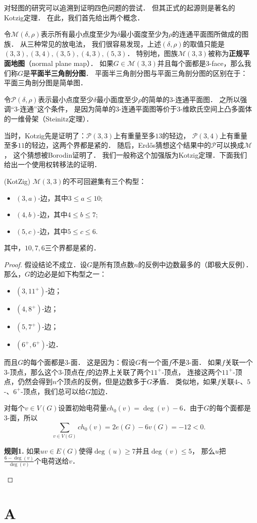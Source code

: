 \documentclass[cn,fancy,blue,11pt]{elegantbook}
\begin{document}
对轻图的研究可以追溯到证明四色问题的尝试．
但其正式的起源则是著名的Kotzig定理．
在此，我们首先给出两个概念．

令$\mathcal{M}(\delta,\rho)$表示所有最小点度至少为$\delta$最小面度至少为$\rho$的连通平面图所做成的图族．
从三种常见的放电法，
我们很容易发现，上述$(\delta,\rho)$的取值只能是$(3,3),(3,4),(3,5),(4,3),(5,3)$．
特别地，图族$\mathcal{M}(3,3)$被称为\textbf{正规平面地图}（normal plane map）．
如果$G\in \mathcal{M}(3,3)$并且每个面都是$3$-face，那么我们称$G$是\textbf{平面半三角剖分图}．
平面半三角剖分图与平面三角剖分图的区别在于：平面三角剖分图是简单图．

令$\mathcal{P}(\delta,\rho)$表示最小点度至少$\delta$最小面度至少$\rho$的简单的$3$-连通平面图．
之所以强调``3-连通''这个条件，
是因为简单的3-连通平面图等价于3-维欧氏空间上凸多面体的一维骨架（Steinitz定理）．

当时，Kotzig先是证明了：$\mathcal{P}(3,3)$上有重量至多$13$的轻边，
$\mathcal{P}(3,4)$上有重量至多$11$的轻边，这两个界都是紧的．
随后，Erd\H{o}s猜想这个结果中的$\mathcal{P}$可以换成$\mathcal{M}$，
这个猜想被Borodin证明了．
我们一般称这个加强版为Kotzig定理．下面我们给出一个使用权转移法的证明．

\begin{theorem}{(KotZig)}{}
	$\mathcal{M}(3,3)$的不可回避集有三个构型：
	\begin{itemize}
		\item $(3,a)$-边，其中$3\le a\le 10$;
		\item $(4,b)$-边，其中$4\le b\le 7$;
		\item $(5,c)$-边，其中$5\le c\le 6$.
	\end{itemize}
	其中，$10,7,6$三个界都是紧的．
\end{theorem}

\begin{proof}
	假设结论不成立．设$G$是所有顶点数$n$的反例中边数最多的（即极大反例）．
	那么，$G$的边必是如下构型之一：
	\begin{itemize}
		\item $(3,11^+)$-边；
		\item $(4,8^+)$-边；
		\item $(5,7^+)$-边；
		\item $(6^+,6^+)$-边．
	\end{itemize}
	而且$G$的每个面都是$3$-面．
	这是因为：假设$G$有一个面$f$不是$3$-面．
	如果$f$关联一个$3$-顶点，那么这个$3$-顶点在$f$的边界上关联了两个$11^+$-顶点，
	连接这两个$11^+$-顶点，仍然会得到$n$个顶点的反例，但是边数多于$G$矛盾．
	类似地，如果$f$关联$4$-、$5$-、$6^+$-顶点，我们总可以给$G$加边．

	对每个$v\in V(G)$设置初始电荷量$ch_0(v)=\deg(v)-6$．由于$G$的每个面都是$3$-面，所以
	\[\sum_{v\in V(G)}ch_0(v)=2e(G)-6v(G)=-12<0.\]

	\begin{discharge}
		\textbf{规则1.} 如果$uv\in E(G)$使得$\deg(u)\ge7$并且$\deg(v)\le 5$，
		那么$u$把$\frac{6-\deg(v)}{\deg(v)}$个电荷送给$v$．
	\end{discharge}
\end{proof}









\appendix

\chapter{A}
\end{document}
